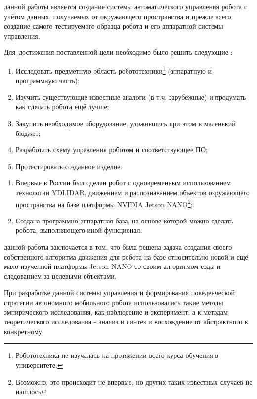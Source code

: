 
{\actuality}

{\progress}

{\aim} данной работы является создание системы автоматического управления робота с учётом данных, получаемых от окружающего пространства и прежде всего создание самого тестируемого образца робота и его аппаратной системы управления. 

Для~достижения поставленной цели необходимо было решить следующие {\tasks}:
\begin{enumerate}
  \item Исследовать предметную область робототехники\footnote{Робототехника не изучалась на протяжении всего курса обучения в университете.} (аппаратную и программную часть);
  \item Изучить существующие известные аналоги (в т.ч. зарубежные) и продумать как сделать робота ещё лучше;
  \item Закупить необходимое оборудование, уложившись при этом в маленький бюджет; 
  \item Разработать схему управления роботом и соответствующее ПО;
  \item Протестировать созданное изделие.
\end{enumerate}


{\novelty}
\begin{enumerate}
  \item Впервые в России был сделан робот с одновременным использованием технологии YDLIDAR, движением и распознаванием объектов окружающего пространства на базе платформы NVIDIA Jetson NANO\footnote{Возможно, это происходит не впервые, но других таких известных случаев не нашлось};
  \item Создана программно-аппаратная база, на основе которой можно сделать робота, выполняющего иной функционал.
\end{enumerate}

{\influence} данной работы заключается в том, что была решена задача создания своего собственного алгоритма движения для робота на базе относительно новой и ещё мало изученной платформы Jetson NANO со своим алгоритмом езды и следованием за целевыми объектами.

{\methods} При разработке данной системы управления и формирования поведенческой стратегии автономного мобильного робота использовались такие методы эмпирического исследования, как наблюдение и эксперимент, а к методам теоретического исследования - анализ и синтез и восхождение от абстрактного к конкретному.
